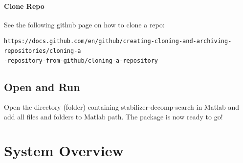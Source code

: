 \documentclass[11pt]{article}
\begin{document}
\paragraph*{Clone Repo}
See the following github page on how to clone a repo:

\begin{verbatim}
https://docs.github.com/en/github/creating-cloning-and-archiving-repositories/cloning-a
-repository-from-github/cloning-a-repository
\end{verbatim}

\subsection{Open and Run}
Open the directory (folder) containing stabilizer-decomp-search in Matlab and add all files and folders to Matlab path. The package is now ready to go!


\section{System Overview}
\end{document}
